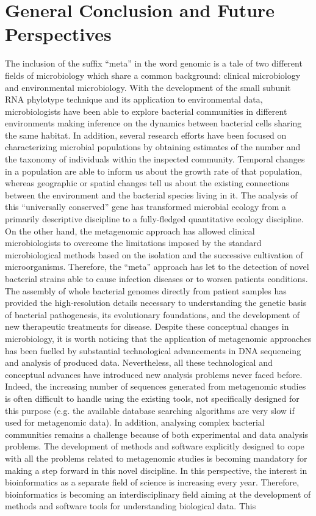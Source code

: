 \logvartrue
\chapter{General Conclusion and Future Perspectives}
The inclusion of the suffix ``meta'' in the word genomic is a tale of two different fields of microbiology which share a common background: clinical microbiology and environmental microbiology. With the development of the small subunit RNA phylotype technique and its application to environmental data, microbiologists have been able to explore bacterial communities in different environments making inference on the dynamics between bacterial cells sharing the same habitat. In addition, several research efforts have been focused on characterizing microbial populations by obtaining estimates of the number and the taxonomy of individuals within the inspected community. Temporal changes in a population are able to inform us about the growth rate of that population, whereas geographic or spatial changes tell us about the existing connections between the environment and the bacterial species living in it. The analysis of this ``universally conserved'' gene has transformed microbial ecology from a primarily descriptive discipline to a fully-fledged quantitative ecology discipline. On the other hand, the metagenomic approach has allowed clinical microbiologists to overcome the limitations imposed by the standard microbiological methods based on the isolation and the successive cultivation of microorganisms. Therefore, the ``meta'' approach has let to the detection of novel bacterial strains able to cause infection diseases or to worsen patients conditions. The assembly of whole bacterial genomes directly from patient samples has provided the high-resolution details necessary to understanding the genetic basis of bacterial pathogenesis, its evolutionary foundations, and the development of new therapeutic treatments for disease. Despite these conceptual changes in microbiology, it is worth noticing that the application of metagenomic approaches has been fuelled by substantial technological advancements in DNA sequencing and analysis of produced data. Nevertheless, all these technological and conceptual advances have introduced new analysis problems never faced before. Indeed, the increasing number of sequences generated from metagenomic studies is often difficult to handle using the existing tools, not specifically designed for this purpose (e.g. the available database searching algorithms are very slow if used for metagenomic data). In addition, analysing complex bacterial communities remains a challenge because of both experimental and data analysis problems. The development of methods and software explicitly designed to cope with all the problems related to metagenomic studies is becoming mandatory for making a step forward in this novel discipline. In this perspective, the interest in bioinformatics as a separate field of science is increasing every year. Therefore, bioinformatics is becoming an interdisciplinary field aiming at the development of methods and software tools for understanding biological data. This 